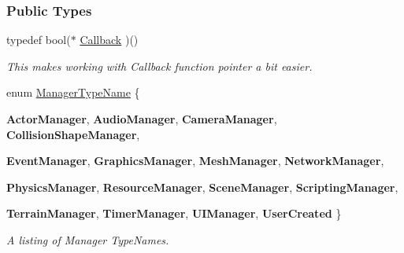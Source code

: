 \subsubsection*{Public Types}
\begin{DoxyCompactItemize}
\item 
\hypertarget{classMezzanine_1_1ManagerBase_ab23a9aa27c4e3cb58d902a149d3c6de2}{
typedef bool($\ast$ \hyperlink{classMezzanine_1_1ManagerBase_ab23a9aa27c4e3cb58d902a149d3c6de2}{Callback} )()}
\label{classMezzanine_1_1ManagerBase_ab23a9aa27c4e3cb58d902a149d3c6de2}

\begin{DoxyCompactList}\small\item\em This makes working with Callback function pointer a bit easier. \item\end{DoxyCompactList}\item 
enum \hyperlink{classMezzanine_1_1ManagerBase_a08cecf5169cad3e82be81a3a159b0b6e}{ManagerTypeName} \{ \par
{\bfseries ActorManager}, 
{\bfseries AudioManager}, 
{\bfseries CameraManager}, 
{\bfseries CollisionShapeManager}, 
\par
{\bfseries EventManager}, 
{\bfseries GraphicsManager}, 
{\bfseries MeshManager}, 
{\bfseries NetworkManager}, 
\par
{\bfseries PhysicsManager}, 
{\bfseries ResourceManager}, 
{\bfseries SceneManager}, 
{\bfseries ScriptingManager}, 
\par
{\bfseries TerrainManager}, 
{\bfseries TimerManager}, 
{\bfseries UIManager}, 
{\bfseries UserCreated}
 \}
\begin{DoxyCompactList}\small\item\em A listing of Manager TypeNames. \item\end{DoxyCompactList}\end{DoxyCompactItemize}
